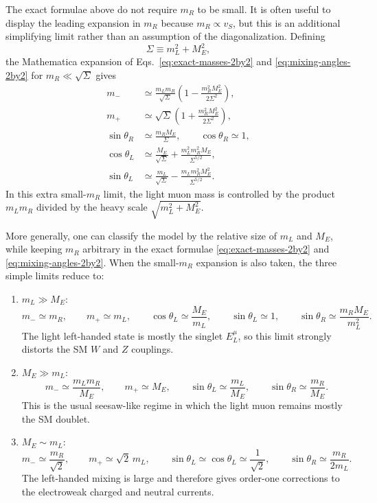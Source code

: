 \documentclass[onecolumn, aps, nofootinbib, prd, preprint, floats, floatfix, amsmath, amssymb, superscriptaddress, preprintnumbers]{revtex4-1}
\begin{document}
The exact formulae above do not require $m_R$ to be small. It is often useful to display the leading expansion in $m_R$ because $m_R\propto v_S$, but this is an additional simplifying limit rather than an assumption of the diagonalization. Defining
\begin{equation}
\Sigma\equiv m_L^2+M_E^2,
\end{equation}
the Mathematica expansion of Eqs.~\eqref{eq:exact-masses-2by2} and \eqref{eq:mixing-angles-2by2} for $m_R\ll \sqrt \Sigma$ gives
\begin{equation}
\begin{aligned}
m_-&\simeq \frac{m_Lm_R}{\sqrt \Sigma}
\left(1-\frac{m_R^2M_E^2}{2\Sigma^2}\right),\\
m_+&\simeq \sqrt \Sigma
\left(1+\frac{m_R^2M_E^2}{2\Sigma^2}\right),\\
\sin\theta_R&\simeq \frac{m_RM_E}{\Sigma},\qquad
\cos\theta_R\simeq 1,\\
\cos\theta_L&\simeq
\frac{M_E}{\sqrt \Sigma}
+\frac{m_L^2m_R^2M_E}{\Sigma^{5/2}},\\
\sin\theta_L&\simeq
\frac{m_L}{\sqrt \Sigma}
-\frac{m_Lm_R^2M_E^2}{\Sigma^{5/2}} .
\end{aligned}
\label{eq:small-mR-expansion}
\end{equation}
In this extra small-$m_R$ limit, the light muon mass is controlled by the product $m_Lm_R$ divided by the heavy scale $\sqrt{m_L^2+M_E^2}$.

More generally, one can classify the model by the relative size of $m_L$ and $M_E$, while keeping $m_R$ arbitrary in the exact formulae \eqref{eq:exact-masses-2by2} and \eqref{eq:mixing-angles-2by2}. When the small-$m_R$ expansion is also taken, the three simple limits reduce to:
\begin{enumerate}
\item $m_L\gg M_E$:
\begin{equation}
m_-\simeq m_R,\qquad
m_+\simeq m_L,\qquad
\cos\theta_L\simeq \frac{M_E}{m_L},\qquad
\sin\theta_L\simeq 1,\qquad
\sin\theta_R\simeq \frac{m_RM_E}{m_L^2}.
\end{equation}
The light left-handed state is mostly the singlet $E^\mu_L$, so this limit
strongly distorts the SM $W$ and $Z$ couplings.
\item $M_E\gg m_L$:
\begin{equation}
m_-\simeq \frac{m_Lm_R}{M_E},\qquad
m_+\simeq M_E,\qquad
\sin\theta_L\simeq \frac{m_L}{M_E},\qquad
\sin\theta_R\simeq \frac{m_R}{M_E}.
\end{equation}
This is the usual seesaw-like regime in which the light muon remains mostly
the SM doublet.
\item $M_E\sim m_L$:
\begin{equation}
m_-\simeq \frac{m_R}{\sqrt2},\qquad
m_+\simeq \sqrt2\,m_L,\qquad
\sin\theta_L\simeq \cos\theta_L\simeq \frac{1}{\sqrt2},\qquad
\sin\theta_R\simeq \frac{m_R}{2m_L}.
\end{equation}
The left-handed mixing is large and therefore gives order-one corrections to
the electroweak charged and neutral currents.
\end{enumerate}
\end{document}
